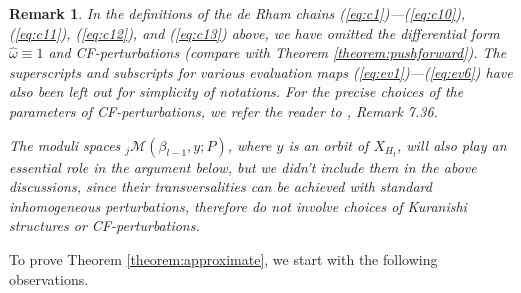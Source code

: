 \documentclass[a4paper]{article}
\newtheorem{remark}[theorem]{Remark}
\numberwithin{equation}{section}
\begin{document}
\begin{remark}
In the definitions of the de Rham chains (\ref{eq:c1})---(\ref{eq:c10}), (\ref{eq:c11}), (\ref{eq:c12}), and (\ref{eq:c13}) above, we have omitted the differential form $\hat{\omega}\equiv1$ and CF-perturbations (compare with Theorem \ref{theorem:pushforward}). The superscripts and subscripts for various evaluation maps (\ref{eq:ev1})---(\ref{eq:ev6}) have also been left out for simplicity of notations. For the precise choices of the parameters of CF-perturbations, we refer the reader to \cite{ki2}, Remark 7.36.

The moduli spaces ${}_j\mathcal{M}(\beta_{l-1},y;P)$, where $y$ is an orbit of $X_{H_t}$, will also play an essential role in the argument below, but we didn't include them in the above discussions, since their transversalities can be achieved with standard inhomogeneous perturbations, therefore do not involve choices of Kuranishi structures or CF-perturbations.
\end{remark}

To prove Theorem \ref{theorem:approximate}, we start with the following observations.
\end{document}
